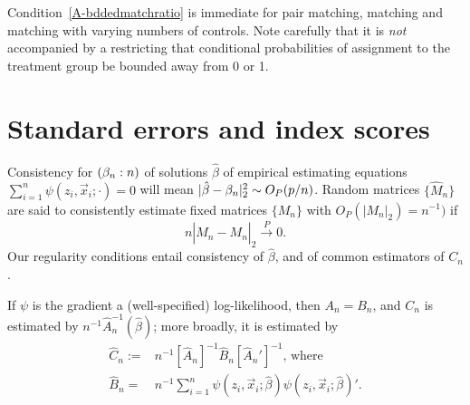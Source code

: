 \documentclass{article}
\theoremstyle{remark}
\begin{document}
Condition~\ref{A-bddedmatchratio} is immediate for pair matching,  matching and matching with varying numbers of controls.  Note carefully that it is \textit{not} accompanied by a restricting that conditional probabilities of assignment to the treatment group be bounded away from 0 or 1. 

\section{Standard errors and index scores}

Consistency for $(\beta_{n }: n)$ of solutions $\hat{\beta}$ of empirical estimating equations $\sum_{i=1}^{n}\psi(z_{i}, \vec{x}_{i}; \cdot) = 0 $ will mean  $|\hat\beta - \beta_{n }|_{2}^{2} \sim O_{P}(p/n)$.
Random matrices $\{ \hat{M}_{n} \}$ are said to consistently estimate fixed matrices $\{M_{n}\}$ with $O_{P}(|M_{n}|_{2}) = n^{-1})$ if
$$n|\hat{M}_{n} - {M}_{n}|_{2} \stackrel{P}{\rightarrow} 0.$$
Our regularity conditions entail consistency of $\hat\beta$, and of common estimators of $C_{n}$.  

If $\psi$ is the gradient a (well-specified) log-likelihood, then $A_{n}=B_{n}$, and $C_{n}$ is estimated by $n^{-1}\hat{A}_{n}^{-1}(\hat\beta)$; more broadly, it is estimated by 
\begin{align*}
\hat{C}_{n} :=& n^{-1} [\hat{A}_{n}]^{-1} \hat{B}_{n} [\hat{A}_{n}']^{-1},\, \text{where}\\
\hat{B}_{n}  =&  n^{-1} \sum_{i=1}^{n} \psi(z_{i}, \vec{x}_{i};  \hat{\beta} ) \psi(z_{i}, \vec{x}_{i};  \hat{\beta} )'.  
\end{align*}
\end{document}
